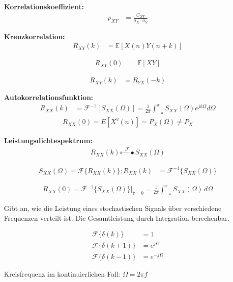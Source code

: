 \textbf{Korrelationskoeffizient:}
\begin{align}
\rho_{XY} &= \frac{C_{XY}}{\sigma_X \cdot \sigma_Y}
\end{align}


\textbf{Kreuzkorrelation:}
\begin{align}
R_{XY}(k) &= \mathbb{E}[X(n)Y(n+k)]
\end{align}

\begin{align}
R_{XY}(0) &= \mathbb{E}[XY]
\end{align}

\begin{align}
R_{XY}(k) &= R_{YX}(-k)
\end{align}

\textbf{Autokorrelationsfunktion:}
\begin{align}
R_{XX}(k) &= \mathcal{F}^{-1}[S_{XX}(\Omega)] = \frac{1}{2\pi} \int_{-\pi}^{\pi} S_{XX}(\Omega) e^{j k \Omega} d\Omega
\end{align}
\begin{align}
R_{XX}(0) =E[X^2(n)] = P_X(\Omega) \neq P_X
\end{align}

\textbf{Leistungsdichtespektrum:}
\begin{align}
R_{XX}(k) \overset{\mathcal{F}}{\circ\mbox{---}\bullet} S_{XX}(\Omega)
\end{align}

\begin{align}
S_{XX}(\Omega) = \mathcal{F}\{R_{XX}(k)\}; R_{XX}(k) &=  \mathcal{F}^{-1}\{S_{XX}(\Omega)\}
\end{align}

\begin{align}
R_{XX}(0) = \mathcal{F}^{-1}\{S_{XX}(\Omega)\}|_{\tau=0} = \frac{1}{2\pi} \int_{-\pi}^{\pi} S_{XX}(\Omega) \, d\Omega
\end{align}

Gibt an, wie die Leistung eines stochastischen Signals über verschiedene Frequenzen verteilt ist. Die Gesamtleistung durch Integration berechenbar.

\begin{align}
\mathcal{F}\{\delta(k)\} &= 1 \\
\mathcal{F}\{\delta(k+1)\} &= e^{j\Omega} \\
\mathcal{F}\{\delta(k-1)\} &= e^{-j\Omega}
\end{align}

Kreisfrequenz im kontinuierlichen Fall: $\Omega = 2 \pi f$

